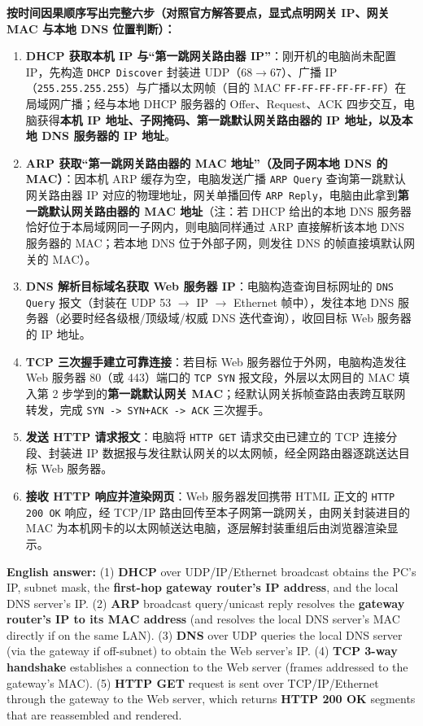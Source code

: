\textbf{按时间因果顺序写出完整六步（对照官方解答要点，显式点明网关 IP、网关 MAC 与本地 DNS 位置判断）：}
\begin{enumerate}
\item \textbf{DHCP 获取本机 IP 与“第一跳网关路由器 IP”}：刚开机的电脑尚未配置 IP，先构造 \texttt{DHCP Discover} 封装进 UDP（68$\to$67）、广播 IP（\texttt{255.255.255.255}）与广播以太网帧（目的 MAC \texttt{FF-FF-FF-FF-FF-FF}）在局域网广播；经与本地 DHCP 服务器的 Offer、Request、ACK 四步交互，电脑获得\textbf{本机 IP 地址、子网掩码、第一跳默认网关路由器的 IP 地址，以及本地 DNS 服务器的 IP 地址}。
\item \textbf{ARP 获取“第一跳网关路由器的 MAC 地址”（及同子网本地 DNS 的 MAC）}：因本机 ARP 缓存为空，电脑发送广播 \texttt{ARP Query} 查询第一跳默认网关路由器 IP 对应的物理地址，网关单播回传 \texttt{ARP Reply}，电脑由此拿到\textbf{第一跳默认网关路由器的 MAC 地址}（注：若 DHCP 给出的本地 DNS 服务器恰好位于本局域网同一子网内，则电脑同样通过 ARP 直接解析该本地 DNS 服务器的 MAC；若本地 DNS 位于外部子网，则发往 DNS 的帧直接填默认网关的 MAC）。
\item \textbf{DNS 解析目标域名获取 Web 服务器 IP}：电脑构造查询目标网址的 \texttt{DNS Query} 报文（封装在 UDP 53 $\to$ IP $\to$ Ethernet 帧中），发往本地 DNS 服务器（必要时经各级根/顶级域/权威 DNS 迭代查询），收回目标 Web 服务器的 IP 地址。
\item \textbf{TCP 三次握手建立可靠连接}：若目标 Web 服务器位于外网，电脑构造发往 Web 服务器 80（或 443）端口的 \texttt{TCP SYN} 报文段，外层以太网目的 MAC 填入第 2 步学到的\textbf{第一跳默认网关 MAC}；经默认网关拆帧查路由表跨互联网转发，完成 \texttt{SYN -> SYN+ACK -> ACK} 三次握手。
\item \textbf{发送 HTTP 请求报文}：电脑将 \texttt{HTTP GET} 请求交由已建立的 TCP 连接分段、封装进 IP 数据报与发往默认网关的以太网帧，经全网路由器逐跳送达目标 Web 服务器。
\item \textbf{接收 HTTP 响应并渲染网页}：Web 服务器发回携带 HTML 正文的 \texttt{HTTP 200 OK} 响应，经 TCP/IP 路由回传至本子网第一跳网关，由网关封装进目的 MAC 为本机网卡的以太网帧送达电脑，逐层解封装重组后由浏览器渲染显示。
\end{enumerate}

\textbf{English answer:} (1) \textbf{DHCP} over UDP/IP/Ethernet broadcast obtains the PC's IP, subnet mask, the \textbf{first-hop gateway router's IP address}, and the local DNS server's IP. (2) \textbf{ARP} broadcast query/unicast reply resolves the \textbf{gateway router's IP to its MAC address} (and resolves the local DNS server's MAC directly if on the same LAN). (3) \textbf{DNS} over UDP queries the local DNS server (via the gateway if off-subnet) to obtain the Web server's IP. (4) \textbf{TCP 3-way handshake} establishes a connection to the Web server (frames addressed to the gateway's MAC). (5) \textbf{HTTP GET} request is sent over TCP/IP/Ethernet through the gateway to the Web server, which returns \textbf{HTTP 200 OK} segments that are reassembled and rendered.


